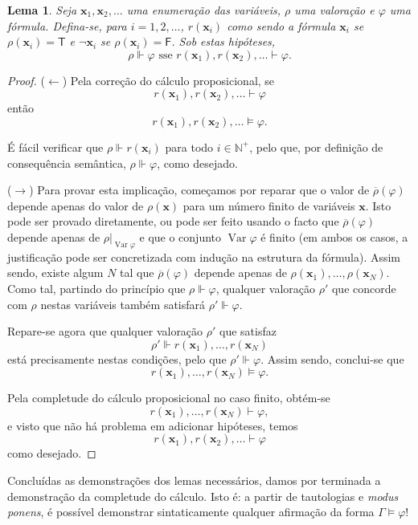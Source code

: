 \documentclass{report}
\newtheorem{lema}{Lema}
\theoremstyle{definition}
\theoremstyle{remark}
\newcommand{\N}{\mathbb{N}}
\renewcommand{\bf}[1]{\mathbf{#1}}
\newcommand{\lt}{\mathsf{T}}
\newcommand{\lf}{\mathsf{F}}
\DeclareMathOperator{\var}{Var}
\begin{document}
	\begin{lema}\label{lema:3}
	Seja $\bf x_1, \bf x_2, \dots$ uma enumeração das variáveis, $\rho$ uma valoração e $\varphi$ uma fórmula. Defina-se, para $i = 1, 2, \dots$, $r(\bf x_i)$ como sendo a fórmula $\bf x_i$ se $\rho(\bf x_i) = \lt$ e $\neg \bf x_i$ se $\rho(\bf x_i) = \lf$. Sob estas hipóteses,
	\[\rho \Vdash \varphi \text{ sse } r(\bf x_1), r(\bf x_2), \dots \vdash \varphi.\]
	\end{lema}
	
	\begin{proof}
	($\leftarrow$) Pela correção do cálculo proposicional, se
	\[r(\bf x_1), r(\bf x_2), \dots \vdash \varphi\]
	então
	\[r(\bf x_1), r(\bf x_2), \dots \vDash \varphi.\]
	
	É fácil verificar que $\rho \Vdash r(\bf x_i)$ para todo $i \in \N^+$, pelo que, por definição de consequência semântica, $\rho \Vdash \varphi$, como desejado.
	
	\medskip
	
	($\rightarrow$) Para provar esta implicação, começamos por reparar que o valor de $\overline\rho(\varphi)$ depende apenas do valor de $\rho(\bf x)$ para um número finito de variáveis $\bf x$. Isto pode ser provado diretamente, ou pode ser feito usando o facto que $\overline\rho(\varphi)$ depende apenas de $\rho|_{\var \varphi}$ e que o conjunto $\var \varphi$ é finito (em ambos os casos, a justificação pode ser concretizada com indução na estrutura da fórmula). Assim sendo, existe algum $N$ tal que $\overline\rho(\varphi)$ depende apenas de $\rho(\bf x_1), \dots, \rho(\bf x_N)$. Como tal, partindo do princípio que $\rho \Vdash \varphi$, qualquer valoração $\rho'$ que concorde com $\rho$ nestas variáveis também satisfará $\rho' \Vdash \varphi$.
	
	Repare-se agora que qualquer valoração $\rho'$ que satisfaz
	\[\rho' \Vdash r(\bf x_1), \dots, r(\bf x_N)\]
	está precisamente nestas condições, pelo que $\rho' \Vdash \varphi$. Assim sendo, conclui-se que
	\[r(\bf x_1), \dots, r(\bf x_N) \vDash \varphi.\]
	
	Pela completude do cálculo proposicional no caso finito, obtém-se
	\[r(\bf x_1), \dots, r(\bf x_N) \vdash \varphi,\]
	e visto que não há problema em adicionar hipóteses, temos
	\[r(\bf x_1), r(\bf x_2), \dots \vdash \varphi\]
	como desejado.
	\end{proof}
	
	Concluídas as demonstrações dos lemas necessários, damos por terminada a demonstração da completude do cálculo. Isto é: a partir de tautologias e \textit{modus ponens}, é possível demonstrar sintaticamente qualquer afirmação da forma $\Gamma \vDash \varphi$!
	
\end{document}
